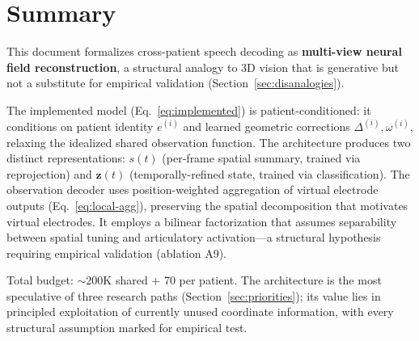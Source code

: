 \documentclass[11pt,letterpaper]{article}
\newcommand{\bfz}{\mathbf{z}}
\begin{document}
\section{Summary}

This document formalizes cross-patient speech decoding as \textbf{multi-view neural field reconstruction}, a structural analogy to 3D vision that is generative but not a substitute for empirical validation (Section~\ref{sec:disanalogies}).

The implemented model (Eq.~\ref{eq:implemented}) is patient-conditioned: it conditions on patient identity $e^{(i)}$ and learned geometric corrections $\Delta^{(i)}, \omega^{(i)}$, relaxing the idealized shared observation function. The architecture produces two distinct representations: $s(t)$ (per-frame spatial summary, trained via reprojection) and $\bfz(t)$ (temporally-refined state, trained via classification). The observation decoder uses position-weighted aggregation of virtual electrode outputs (Eq.~\ref{eq:local-agg}), preserving the spatial decomposition that motivates virtual electrodes. It employs a bilinear factorization that assumes separability between spatial tuning and articulatory activation---a structural hypothesis requiring empirical validation (ablation A9).

Total budget: ${\sim}200$K shared + 70 per patient. The architecture is the most speculative of three research paths (Section~\ref{sec:priorities}); its value lies in principled exploitation of currently unused coordinate information, with every structural assumption marked for empirical test.
\end{document}
